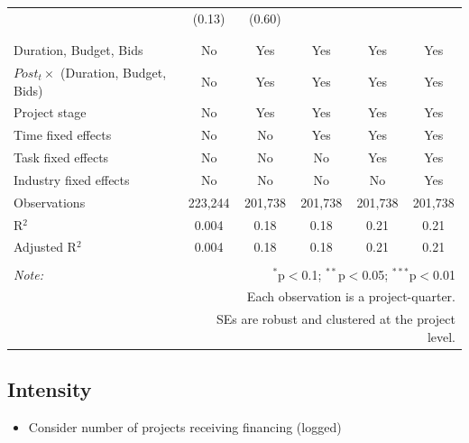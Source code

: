 \documentclass[
]{article}
\providecommand{\tightlist}{%
  \setlength{\itemsep}{0pt}\setlength{\parskip}{0pt}}
\begin{document}
\begin{table}[H]
\begin{tabular}{@{\extracolsep{-2pt}}lccccc}
  & (0.13) & (0.60) &  &  &  \\ 
  & & & & & \\ 
\hline \\[-1.8ex] 
Duration, Budget, Bids & No & Yes & Yes & Yes & Yes \\ 
$Post_t \times $  (Duration, Budget, Bids) & No & Yes & Yes & Yes & Yes \\ 
Project stage & No & Yes & Yes & Yes & Yes \\ 
Time fixed effects & No & No & Yes & Yes & Yes \\ 
Task fixed effects & No & No & No & Yes & Yes \\ 
Industry fixed effects & No & No & No & No & Yes \\ 
Observations & 223,244 & 201,738 & 201,738 & 201,738 & 201,738 \\ 
R$^{2}$ & 0.004 & 0.18 & 0.18 & 0.21 & 0.21 \\ 
Adjusted R$^{2}$ & 0.004 & 0.18 & 0.18 & 0.21 & 0.21 \\ 
\hline 
\hline \\[-1.8ex] 
\textit{Note:}  & \multicolumn{5}{r}{$^{*}$p$<$0.1; $^{**}$p$<$0.05; $^{***}$p$<$0.01} \\ 
 & \multicolumn{5}{r}{Each observation is a project-quarter.} \\ 
 & \multicolumn{5}{r}{SEs are robust and clustered at the project level.} \\ 
\end{tabular} 
\end{table}

\hypertarget{intensity}{%
\subsection{Intensity}\label{intensity}}

\begin{itemize}
\tightlist
\item
  Consider number of projects receiving financing (logged)
\end{itemize}
\end{document}
